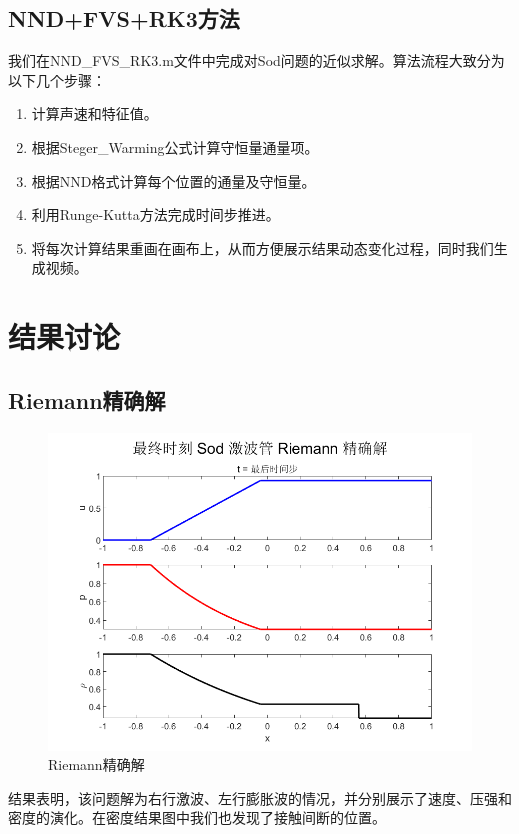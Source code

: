 \documentclass[12pt,a4paper]{article}%
\begin{document}
		\subsection{NND+FVS+RK3方法}
		我们在NND\_FVS\_RK3.m文件中完成对Sod问题的近似求解。算法流程大致分为以下几个步骤：
		\begin{enumerate}
			\item 计算声速和特征值。
			\item 根据Steger\_Warming公式计算守恒量通量项。
			\item 根据NND格式计算每个位置的通量及守恒量。
			\item 利用Runge-Kutta方法完成时间步推进。
			\item 将每次计算结果重画在画布上，从而方便展示结果动态变化过程，同时我们生成视频。
		\end{enumerate}

	\section{结果讨论}
		\subsection{Riemann精确解}
		\begin{figure}[H]
		\centering
		\begin{minipage}{0.83\textwidth}
			\centering
			\includegraphics[width=\textwidth]{./fig/Riemann.png}
			\caption{\fontsize{10pt}{15pt}\selectfont Riemann精确解}
		\end{minipage}
		\end{figure}
		结果表明，该问题解为右行激波、左行膨胀波的情况，并分别展示了速度、压强和密度的演化。在密度结果图中我们也发现了接触间断的位置。
\end{document}
